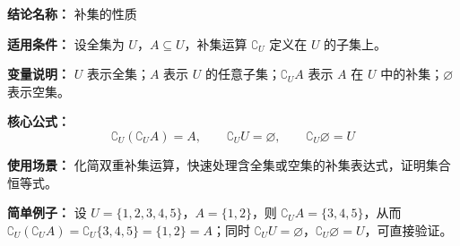 \textbf{结论名称：} 补集的性质

\textbf{适用条件：} 设全集为 $U$，$A \subseteq U$，补集运算 $\complement_{U}$ 定义在 $U$ 的子集上。

\textbf{变量说明：} $U$ 表示全集；$A$ 表示 $U$ 的任意子集；$\complement_{U}A$ 表示 $A$ 在 $U$ 中的补集；$\varnothing$ 表示空集。

\textbf{核心公式：}
\[
\boxed{\complement_{U}(\complement_{U}A)=A,\qquad \complement_{U}U=\varnothing,\qquad \complement_{U}\varnothing=U}
\]

\textbf{使用场景：} 化简双重补集运算，快速处理含全集或空集的补集表达式，证明集合恒等式。

\textbf{简单例子：} 设 $U=\{1,2,3,4,5\}$，$A=\{1,2\}$，则 $\complement_{U}A=\{3,4,5\}$，从而 $\complement_{U}(\complement_{U}A)=\complement_{U}\{3,4,5\}=\{1,2\}=A$；同时 $\complement_{U}U=\varnothing$，$\complement_{U}\varnothing=U$，可直接验证。